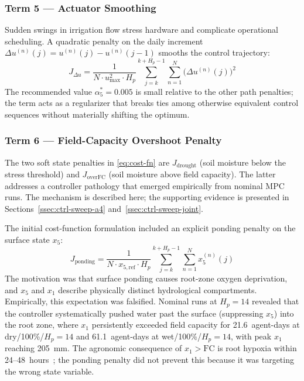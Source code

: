 \subsubsection*{Term 5 — Actuator Smoothing}

Sudden swings in irrigation flow stress hardware and complicate operational
scheduling. A quadratic penalty on the daily increment
$\Delta u^{(n)}(j) = u^{(n)}(j) - u^{(n)}(j-1)$ smooths the control
trajectory:
\begin{equation}
J_{\Delta u} = \frac{1}{N \cdot u_{\max}^2 \cdot H_p}
  \sum_{j=k}^{k+H_p-1} \sum_{n=1}^{N}
  \bigl(\Delta u^{(n)}(j)\bigr)^2
\label{eq:J-deltau}
\end{equation}
The recommended value $\alpha_5^* = 0.005$ is small relative to the other
path penalties; the term acts as a regularizer that breaks ties among
otherwise equivalent control sequences without materially shifting the
optimum.

\subsubsection*{Term 6 — Field-Capacity Overshoot Penalty}
\label{ssec:ctrl-cost-overfc}

The two soft state penalties in \eqref{eq:cost-fn} are $J_{\mathrm{drought}}$
(soil moisture below the stress threshold) and $J_{\mathrm{overFC}}$
(soil moisture above field capacity). The latter addresses a controller
pathology that emerged empirically from nominal MPC runs. The mechanism is
described here; the supporting evidence is presented in
Sections~\ref{ssec:ctrl-sweep-a4} and~\ref{ssec:ctrl-sweep-joint}.

The initial cost-function formulation included an explicit ponding penalty on
the surface state $x_5$:
\begin{equation*}
J_{\mathrm{ponding}} = \frac{1}{N \cdot x_{5,\mathrm{ref}} \cdot H_p}
  \sum_{j=k}^{k+H_p-1} \sum_{n=1}^{N} x_5^{(n)}(j)
\end{equation*}
The motivation was that surface ponding causes root-zone oxygen deprivation,
and $x_5$ and $x_1$ describe physically distinct hydrological compartments.
Empirically, this expectation was falsified. Nominal runs at $H_p = 14$
revealed that the controller systematically pushed water past the surface
(suppressing $x_5$) into the root zone, where $x_1$ persistently exceeded
field capacity for 21.6~agent-days at dry/100\%/$H_p = 14$ and
61.1~agent-days at wet/100\%/$H_p = 14$, with peak $x_1$ reaching 205~mm.
The agronomic consequence of $x_1 > \mathrm{FC}$ is root hypoxia within
24--48~hours~\cite{setter1997}; the ponding penalty did not prevent this
because it was targeting the wrong state variable.

